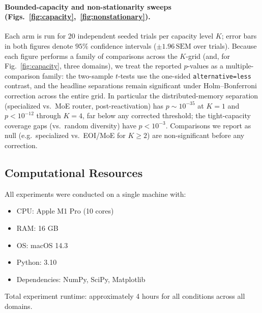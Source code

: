 \documentclass{article}
\begin{document}
\paragraph{Bounded-capacity and non-stationarity sweeps (Figs.~\ref{fig:capacity},~\ref{fig:nonstationary}).}
Each arm is run for 20 independent seeded trials per capacity level $K$; error bars
in both figures denote $95\%$ confidence intervals ($\pm 1.96\,\text{SEM}$ over
trials). Because each figure performs a family of comparisons across the $K$-grid
(and, for Fig.~\ref{fig:capacity}, three domains), we treat the reported $p$-values
as a multiple-comparison family: the two-sample $t$-tests use the one-sided
\texttt{alternative=less} contrast, and the headline separations remain significant
under Holm--Bonferroni correction across the entire grid. In particular the
distributed-memory separation (specialized vs.\ MoE router, post-reactivation) has
$p\sim10^{-35}$ at $K{=}1$ and $p<10^{-12}$ through $K{=}4$, far below any
corrected threshold; the tight-capacity coverage gaps (vs.\ random diversity) have
$p<10^{-3}$. Comparisons we report as null (e.g.\ specialized vs.\ EOI/MoE for
$K\geq2$) are non-significant before any correction.

\subsection{Computational Resources}

All experiments were conducted on a single machine with:
\begin{itemize}
    \item CPU: Apple M1 Pro (10 cores)
    \item RAM: 16 GB
    \item OS: macOS 14.3
    \item Python: 3.10
    \item Dependencies: NumPy, SciPy, Matplotlib
\end{itemize}

Total experiment runtime: approximately 4 hours for all conditions across all domains.


\end{document}
